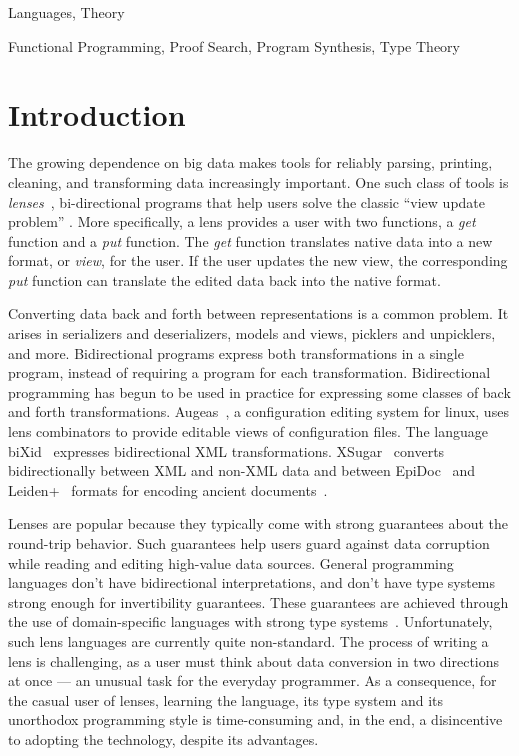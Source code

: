 \documentclass[numbers,10pt,preprint\ifanon ,nocopyrightspace\fi]{sigplanconf}
\begin{document}
\terms Languages, Theory

\keywords Functional Programming, Proof Search, Program Synthesis, Type Theory
\fi

\section{Introduction}

The growing dependence on big data makes tools for reliably parsing,
printing, cleaning, and transforming data increasingly important.
One such class of tools is \emph{lenses}~\cite{Focal2005-long},
bi-directional programs that help users solve the classic ``view update
problem'' \cite{chen2010comparative}.
More specifically, a lens provides a user with two functions, a
\emph{get} function and a \emph{put} function.  The \emph{get}
function translates native data into a new format, or \emph{view}, for
the user.  If the user updates the new view, the corresponding
\emph{put} function can translate the edited data back into
the native format.

Converting data back and forth between representations is a common problem.
It arises in serializers and deserializers, models and views, picklers
and unpicklers, and more.
Bidirectional programs express both transformations in a single program, instead
of requiring a program for each transformation.
Bidirectional programming has begun to be used in practice for expressing some
classes of back and forth transformations.
Augeas~\cite{augeas}, a configuration editing system for linux, uses lens combinators
to provide editable views of configuration files.
The language biXid~\cite{bixid} expresses bidirectional XML
transformations.
XSugar~\cite{xsugar} converts bidirectionally between XML and non-XML data
and between EpiDoc~\cite{epidoc} and
Leiden+~\cite{leidenplus} formats for
encoding ancient documents~\cite{epidocleidenplus}.

Lenses are popular because they typically come with strong guarantees
about the round-trip behavior.  Such guarantees
help users guard against data corruption while reading and editing
high-value data sources.  General programming languages don't
have bidirectional interpretations, and don't have type systems strong
enough for invertibility guarantees. These guarantees are achieved through
the use of domain-specific languages with strong type
systems~\cite{Focal2005-long, boomerang, symmetric-lenses}.
Unfortunately, such
lens languages are currently quite non-standard.  The
process of writing a lens is challenging, as a user must think
about data conversion in two directions at once --- an
unusual task for the everyday programmer.  As a consequence, 
for the casual user of lenses, learning the language, its type system and its
unorthodox programming style is time-consuming and, in the end,
a disincentive to adopting the technology, despite its advantages.
\end{document}
